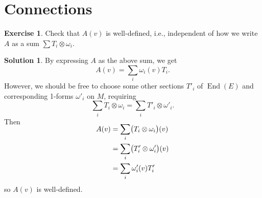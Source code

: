 \documentclass[11pt, a4paper]{report}
\theoremstyle{definition}
\newtheorem{exercise}{Exercise}[part]
\newtheorem{solution}{Solution}[part]
\newenvironment{ex}{\begin{exercise}}{\end{exercise}\pagebreak[1]}
\newenvironment{sol}{\begin{solution}}{\end{solution}\pagebreak[3]}
\DeclareMathOperator{\End}{End}
\begin{document}
\section{Connections}

\begin{ex}

Check that $A(v)$ is well-defined, i.e., independent of how we write $A$ as a sum $\sum T_i \otimes \omega_i$.

\end{ex}

\begin{sol}

By expressing $A$ as the above sum, we get
\[
    A(v) = \sum_i \omega_i (v) T_i.
\]
However, we should be free to choose some other sections $T'_i$ of $\End(E)$ and corresponding 1-forms $\omega'_i$ on $M$, requiring
\[
    \sum_i T_i \otimes \omega_i = \sum_i T'_i \otimes \omega'_i.
\]
Then
\begin{align*}
    \SwapAboveDisplaySkip
    A(v) &= \sum_i \bigl(T_i \otimes \omega_i\bigr) (v) \\
         &= \sum_i \bigl(T'_i \otimes \omega'_i\bigr) (v) \\
         &= \sum_i \omega'_i (v) T'_i
\end{align*}
so $A(v)$ is well-defined.

\end{sol}
\end{document}
